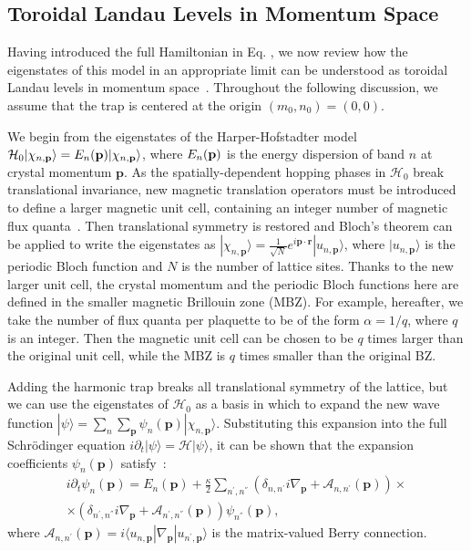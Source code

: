 \documentclass[twocolumn, 10pt, aps, superscriptaddress, floatfix, showpacs, pra, citeautoscript]{revtex4-1}
\newcommand{\vt}[1]{\mathbf{#1}}
\newcommand{\bra}[1]{\langle #1|}
\newcommand{\ket}[1]{|#1\rangle}
\begin{document}
\subsection{Toroidal Landau Levels in Momentum Space}\label{sec:eigenstates}

Having introduced the full Hamiltonian  in Eq. , we now review how the eigenstates of this model in an appropriate limit can be understood as toroidal Landau levels in momentum space~\cite{price2014magnetic}. Throughout the following discussion, we assume that the trap is centered at the origin $(m_0, n_0)= (0,0)$.  

We begin from the eigenstates of the Harper-Hofstadter model $\mathcal{H}_0\ket{\chi_{n,\vt{p}}} = E_n ({\bf p}) \ket{\chi_{n,\vt{p}}}$, where $E_n ({\bf p}) $ is the energy dispersion of band $n$ at crystal momentum $\vt{p}$. As the spatially-dependent hopping phases in $\mathcal{H}_0$ break translational invariance, new magnetic translation operators must be introduced to define a larger magnetic unit cell, containing an integer number of magnetic flux quanta~\cite{zak1964group, zak1964representations, 1chang}. Then translational symmetry is restored and Bloch's theorem can be applied to write the eigenstates as $\ket{\chi_{n,\vt{p}}} = \frac{1}{\sqrt{N}} e^{i\vt{p}\cdot \vt{r}} \ket{u_{n,\vt{p}}}$, where $\ket{u_{n,\vt{p}}}$ is the periodic Bloch function and $N$ is the number of lattice sites. Thanks to the new larger unit cell, the crystal momentum and the periodic Bloch functions here are defined in the smaller magnetic Brillouin zone (MBZ). For example, hereafter, we take the number of flux quanta per plaquette to be of the form $\alpha=1/q$, where $q$ is an integer. Then the magnetic unit cell can be chosen to be $q$ times larger than the original unit cell, while the MBZ is $q$ times smaller than the original BZ.

Adding the harmonic trap breaks all translational symmetry of the lattice, but we can use the eigenstates of $\mathcal{H}_0$ as a basis in which to expand the new wave function 
$\ket{\psi} = \sum_n\sum_{\vt{p}} \psi_n(\vt{p})
\ket{\chi_{n,\vt{p}}}$. Substituting this expansion into the full Schr\"{o}dinger equation
$i \partial_t \ket{\psi} = \mathcal{H} \ket{\psi}$, it can be shown that the expansion coefficients $\psi_n(\vt{p})$ satisfy~\cite{price2014magnetic}:
%
\begin{multline} 
  i \partial_t \psi_n(\vt{p}) = E_n(\vt{p}) + \frac{\kappa}{2}\sum_{n^{'},n^{''}}\left(\delta_{n,n^{'}}i \nabla_{\vt{p}} + \mathcal{A}_{n,n^{'}}(\vt{p})\right)\times \\ \times \left(\delta_{n^{'},n^{''}}i\nabla_{\vt{p}} + \mathcal{A}_{n^{'},n^{''}}(\vt{p})\right) \psi_{n^{''}}(\vt{p}) ,  \label{eq:first}
\end{multline}
where $\mathcal{A}_{n,n^{'}}(\vt{p}) = i\bra{u_{n,\vt{p}}}\nabla_{\vt{p}}\ket{u_{n^{'},\vt{p}}}$ is the matrix-valued Berry connection. 
\end{document}
